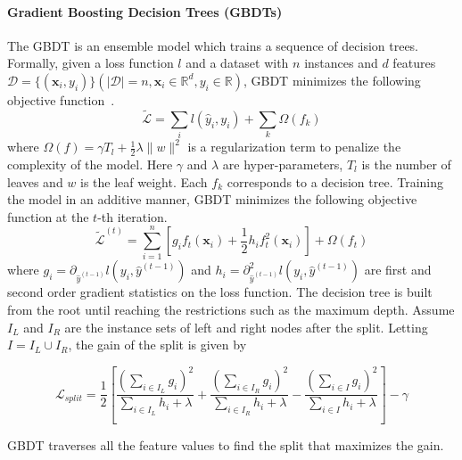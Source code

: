 \documentclass[letterpaper]{article} %
\theoremstyle{definition}
\newcommand\norm[1]{\lVert#1\rVert}
\begin{document}
\paragraph{Gradient Boosting Decision Trees (GBDTs)}
The GBDT is an ensemble model which trains a sequence of decision trees. Formally, given a loss function $l$ and a dataset with $n$ instances and $d$ features $\mathcal{D}=\{(\mathbf{x}_i, y_i)\} (|\mathcal{D}|=n, \mathbf{x}_i\in \mathbb{R}^d, y_i\in \mathbb{R})$,
GBDT minimizes the following objective function~\cite{chen2016xgboost}.
\begin{equation}
    \mathcal{\tilde{L}} = \sum_il(\hat{y}_i,y_i)+\sum_k \Omega(f_k)
\end{equation}
where $\Omega(f)= \gamma T_l + \frac{1}{2}\lambda \norm{w}^2$ is a regularization term to penalize the complexity of the model. Here $\gamma$ and $\lambda$ are hyper-parameters, $T_l$ is the number of leaves and $w$ is the leaf weight. Each $f_k$ corresponds to a decision tree.
Training the model in an additive manner, GBDT minimizes the following objective function at the $t$-th iteration.
\begin{equation}
    \mathcal{\tilde{L}}^{(t)} = \sum_{i=1}^{n} [g_i f_t(\mathbf{x}_i)+\frac{1}{2}h_i f_t^2(\mathbf{x}_i)]+\Omega(f_t)
\label{eq:xg_loss}
\end{equation}
where $g_i = \partial_{\hat{y}^{(t-1)}}l(y_i,\hat{y}^{(t-1)})$ and $h_i = \partial_{\hat{y}^{(t-1)}}^2l(y_i,\hat{y}^{(t-1)})$ are first and second order gradient statistics on the loss function. The decision tree is built from the root until reaching the restrictions such as the maximum depth. Assume $I_L$ and $I_R$ are the instance sets of left and right nodes after the split. Letting $I = I_L \cup I_R$, the gain of the split is given by
\begin{small}
\begin{equation}
    \mathcal{L}_{split} = \frac{1}{2}[\frac{(\sum_{i\in I_L}g_i)^2}{\sum_{i\in I_L}h_i+\lambda}+\frac{(\sum_{i\in I_R}g_i)^2}{\sum_{i\in I_R}h_i+\lambda}-
    \frac{(\sum_{i\in I}g_i)^2}{\sum_{i\in I}h_i+\lambda}]-\gamma
\label{eq:gain}
\end{equation}
\end{small}

GBDT traverses all the feature values to find the split that maximizes the gain.
\end{document}
